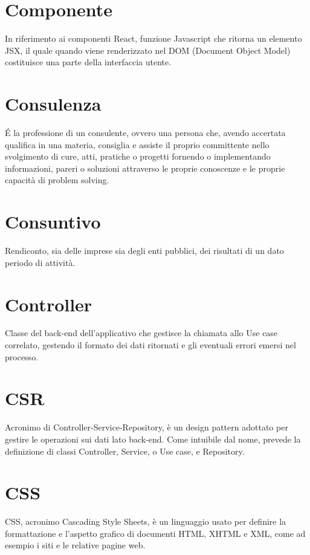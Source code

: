 \section{Componente}\label{sec:Componenti}
In riferimento ai componenti React, funzione Javascript che ritorna un elemento JSX, il quale quando viene renderizzato nel DOM (Document Object Model) costituisce una parte della interfaccia utente.

\section{Consulenza}\label{sec:Consulenze}
É la professione di un consulente, ovvero una persona che, avendo accertata qualifica in una materia, consiglia e assiste il proprio committente nello svolgimento di cure, atti, pratiche o progetti fornendo o implementando informazioni, pareri o soluzioni attraverso le proprie conoscenze e le proprie capacità di problem solving.

\section{Consuntivo}\label{sec:Consuntivi}
Rendiconto, sia delle imprese sia degli enti pubblici, dei risultati di un dato periodo di attività.

\section{Controller}\label{sec:Controllers}
Classe del back-end dell'applicativo che gestisce la chiamata allo Use case correlato, gestendo il formato dei dati ritornati e gli eventuali errori emersi nel processo.

\section{CSR}\label{sec:Controller-Service-Repository}
Acronimo di Controller-Service-Repository, è un design pattern adottato per gestire le operazioni sui dati lato back-end. Come intuibile dal nome, prevede la definizione di classi Controller, Service, o Use case, e Repository.

\section{CSS}\label{sec:Cascading Style Sheets}
CSS, acronimo Cascading Style Sheets, è un linguaggio usato per definire la formattazione e l'aspetto grafico di documenti HTML, XHTML e XML, come ad esempio i siti e le relative pagine web.
